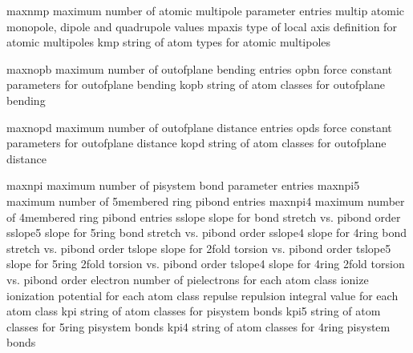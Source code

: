 \documentclass[letterpaper,11pt,english]{sphinxmanual}
\begin{document}

\begin{sphinxVerbatim}[commandchars=\\\{\}]
maxnmp          maximum number of atomic multipole parameter entries
multip          atomic monopole, dipole and quadrupole values
mpaxis          type of local axis definition for atomic multipoles
kmp             string of atom types for atomic multipoles
\end{sphinxVerbatim}


\begin{sphinxVerbatim}[commandchars=\\\{\}]
maxnopb         maximum number of out\PYGZhy{}of\PYGZhy{}plane bending entries
opbn            force constant parameters for out\PYGZhy{}of\PYGZhy{}plane bending
kopb            string of atom classes for out\PYGZhy{}of\PYGZhy{}plane bending
\end{sphinxVerbatim}


\begin{sphinxVerbatim}[commandchars=\\\{\}]
maxnopd         maximum number of out\PYGZhy{}of\PYGZhy{}plane distance entries
opds            force constant parameters for out\PYGZhy{}of\PYGZhy{}plane distance
kopd            string of atom classes for out\PYGZhy{}of\PYGZhy{}plane distance
\end{sphinxVerbatim}


\begin{sphinxVerbatim}[commandchars=\\\{\}]
maxnpi          maximum number of pisystem bond parameter entries
maxnpi5         maximum number of 5\PYGZhy{}membered ring pibond entries
maxnpi4         maximum number of 4\PYGZhy{}membered ring pibond entries
sslope          slope for bond stretch vs. pi\PYGZhy{}bond order
sslope5         slope for 5\PYGZhy{}ring bond stretch vs. pi\PYGZhy{}bond order
sslope4         slope for 4\PYGZhy{}ring bond stretch vs. pi\PYGZhy{}bond order
tslope          slope for 2\PYGZhy{}fold torsion vs. pi\PYGZhy{}bond order
tslope5         slope for 5\PYGZhy{}ring 2\PYGZhy{}fold torsion vs. pi\PYGZhy{}bond order
tslope4         slope for 4\PYGZhy{}ring 2\PYGZhy{}fold torsion vs. pi\PYGZhy{}bond order
electron        number of pi\PYGZhy{}electrons for each atom class
ionize          ionization potential for each atom class
repulse         repulsion integral value for each atom class
kpi             string of atom classes for pisystem bonds
kpi5            string of atom classes for 5\PYGZhy{}ring pisystem bonds
kpi4            string of atom classes for 4\PYGZhy{}ring pisystem bonds
\end{sphinxVerbatim}
\end{document}
